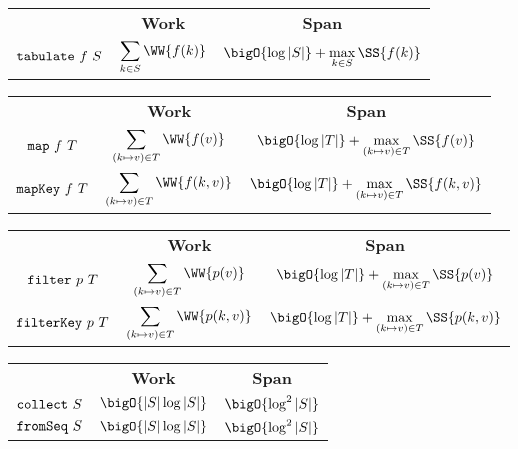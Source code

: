 \begin{costspec}[Tabulate]
\begin{tabular}{c|c|c}
& \textbf{Work} & \textbf{Span} \\
$\texttt{tabulate}~f~S$ &
$\displaystyle\sum_{k \in S} \WW {f(k)}$ &
$\bigO{\log|S|} + \displaystyle\max_{k \in S} \SS{f(k)}$
\end{tabular}
\end{costspec}

\begin{costspec}[Map]
\begin{tabular}{c|c|c}
& \textbf{Work} & \textbf{Span} \\
$\texttt{map}~f~T$ &
$\displaystyle\sum_{(k \mapsto v) \in T} \WW {f(v)}$ &
$\bigO{\log|T|} + \displaystyle\max_{(k \mapsto v) \in T} \SS{f(v)}$
\\
$\texttt{mapKey}~f~T$ &
$\displaystyle\sum_{(k \mapsto v) \in T} \WW {f(k,v)}$ &
$\bigO{\log|T|} + \displaystyle\max_{(k \mapsto v) \in T} \SS{f(k,v)}$
\end{tabular}
\end{costspec}

\begin{costspec}[Filter]
\begin{tabular}{c|c|c}
& \textbf{Work} & \textbf{Span} \\
$\texttt{filter}~p~T$ &
$\displaystyle\sum_{(k \mapsto v) \in T} \WW {p(v)}$ &
$\bigO{\log|T|} + \displaystyle\max_{(k \mapsto v) \in T} \SS{p(v)}$
\\
$\texttt{filterKey}~p~T$ &
$\displaystyle\sum_{(k \mapsto v) \in T} \WW {p(k,v)}$ &
$\bigO{\log|T|} + \displaystyle\max_{(k \mapsto v) \in T} \SS{p(k,v)}$
\end{tabular}
\end{costspec}

\begin{costspec}
\begin{tabular}{c|c|c}
& \textbf{Work} & \textbf{Span} \\
$\texttt{collect}~S$ & $\bigO{|S|\log|S|}$ & $\bigO{\log^2|S|}$ \\
$\texttt{fromSeq}~S$ & $\bigO{|S|\log|S|}$ & $\bigO{\log^2|S|}$
\end{tabular}
\end{costspec}

